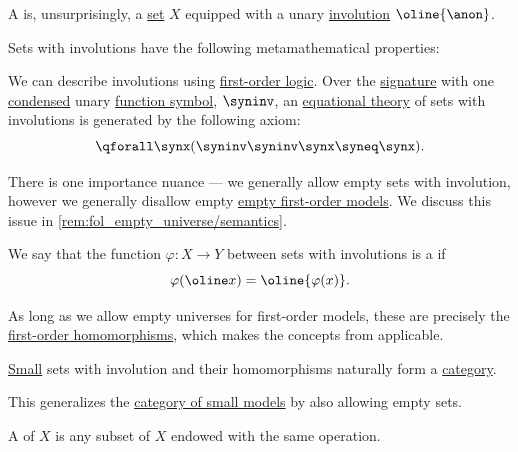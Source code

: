 \begin{definition}\label{def:set_with_involution}\mimprovised
  A  is, unsurprisingly, a \hyperref[def:set]{set} \( X \) equipped with a unary \hyperref[def:set_involution]{involution} \( \oline{\anon} \).

  Sets with involutions have the following metamathematical properties:
  \begin{thmenum}
     We can describe involutions using \hyperref[def:first_order_logic]{first-order logic}. Over the \hyperref[def:fol_signature]{signature} with one \hyperref[def:fol_signature/notation]{condensed} unary \hyperref[def:fol_signature/function]{function symbol}, \( \syninv \), an \hyperref[def:fol_equational_theory]{equational theory} of sets with involutions is generated by the following axiom:
    \begin{equation}\label{eq:def:set_with_involution/theory/axiom}
      \qforall \synx (\syninv \syninv \synx \syneq \synx).
    \end{equation}

    There is one importance nuance --- we generally allow empty sets with involution, however we generally disallow empty \hyperref[def:fol_semantics/model]{empty first-order models}. We discuss this issue in \cref{rem:fol_empty_universe/semantics}.

     We say that the function \( \varphi: X \to Y \) between sets with involutions is a  if
    \begin{equation}\label{eq:def:set_with_involution/morphism}
      \varphi(\oline x) = \oline{\varphi(x)}.
    \end{equation}

    As long as we allow empty universes for first-order models, these are precisely the \hyperref[def:fol_homomorphism]{first-order homomorphisms}, which makes the concepts from  applicable.

     \hyperref[def:small_set]{Small} sets with involution and their homomorphisms naturally form a \hyperref[def:category]{category}.

    This generalizes the \hyperref[def:fol_theory_model_functor/obj]{category of small models} by also allowing empty sets.

     A  of \( X \) is any subset of \( X \) endowed with the same operation.


\end{thmenum}
\end{definition}
